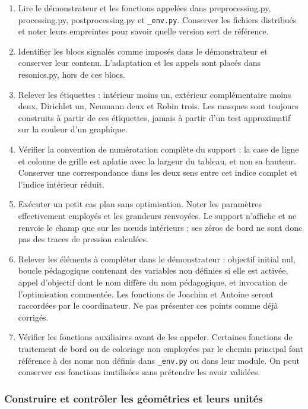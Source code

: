 \documentclass[11pt,a4paper]{article}
\begin{document}
\begin{enumerate}
\item Lire le démonstrateur et les fonctions appelées dans {\small\ttfamily preprocessing.py}, {\small\ttfamily processing.py}, {\small\ttfamily postprocessing.py} et {\small\ttfamily \nolinkurl{_env.py}}. Conserver les fichiers distribués et noter leurs empreintes pour savoir quelle version sert de référence.
\item Identifier les blocs signalés comme imposés dans le démonstrateur et conserver leur contenu. L'adaptation et les appels sont placés dans {\small\ttfamily resonics.py}, hors de ces blocs.
\item Relever les étiquettes : intérieur moins un, extérieur complémentaire moins deux, Dirichlet un, Neumann deux et Robin trois. Les masques sont toujours construits à partir de ces étiquettes, jamais à partir d'un test approximatif sur la couleur d'un graphique.
\item Vérifier la convention de numérotation complète du support : la case de ligne et colonne de grille est aplatie avec la largeur du tableau, et non sa hauteur. Conserver une correspondance dans les deux sens entre cet indice complet et l'indice intérieur réduit.
\item Exécuter un petit cas plan sans optimisation. Noter les paramètres effectivement employés et les grandeurs renvoyées. Le support n'affiche et ne renvoie le champ que sur les nœuds intérieurs ; ses zéros de bord ne sont donc pas des traces de pression calculées.
\item Relever les éléments à compléter dans le démonstrateur : objectif initial nul, boucle pédagogique contenant des variables non définies si elle est activée, appel d'objectif dont le nom diffère du nom pédagogique, et invocation de l'optimisation commentée. Les fonctions de Joachim et Antoine seront raccordées par le coordinateur. Ne pas présenter ces points comme déjà corrigés.
\item Vérifier les fonctions auxiliaires avant de les appeler. Certaines fonctions de traitement de bord ou de coloriage non employées par le chemin principal font référence à des noms non définis dans {\small\ttfamily \nolinkurl{_env.py}} ou dans leur module. On peut conserver ces fonctions inutilisées sans prétendre les avoir validées.
\end{enumerate}

\subsubsection{Construire et contrôler les géométries et leurs unités}
\end{document}
